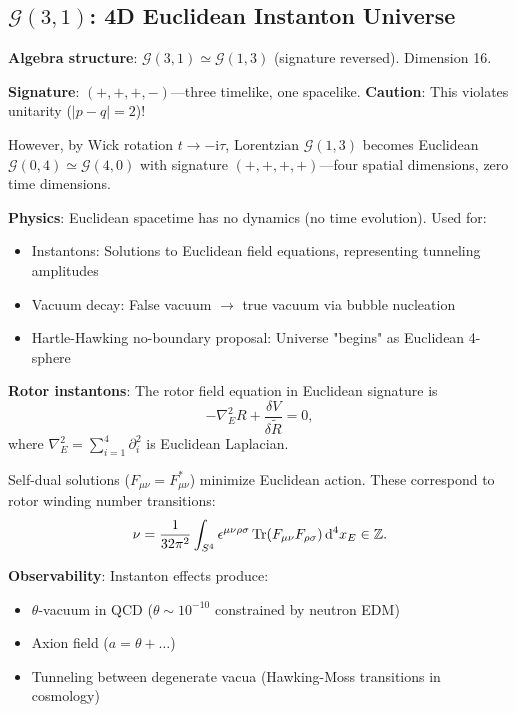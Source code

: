 \documentclass[11pt,a4paper]{article}
\numberwithin{equation}{section}
\theoremstyle{plain}
\theoremstyle{definition}
\theoremstyle{remark}
\newcommand{\Cl}{\mathcal{G}}               %
\newcommand{\rev}[1]{\widetilde{#1}}       %
\newcommand{\dual}[1]{#1^\ast}             %
\renewcommand{\dd}{\mathrm{d}}
\newcommand{\ii}{\mathrm{i}}
\begin{document}
\subsection{$\Cl(3,1)$: 4D Euclidean Instanton Universe}

\textbf{Algebra structure}: $\Cl(3,1) \simeq \Cl(1,3)$ (signature reversed). Dimension 16.

\textbf{Signature}: $(+,+,+,-)$—three timelike, one spacelike. \textbf{Caution}: This violates unitarity ($|p-q| = 2$)!

However, by Wick rotation $t \to -\ii \tau$, Lorentzian $\Cl(1,3)$ becomes Euclidean $\Cl(0,4) \simeq \Cl(4,0)$ with signature $(+,+,+,+)$—four spatial dimensions, zero time dimensions.

\textbf{Physics}: Euclidean spacetime has no dynamics (no time evolution). Used for:
\begin{itemize}
\item Instantons: Solutions to Euclidean field equations, representing tunneling amplitudes
\item Vacuum decay: False vacuum $\to$ true vacuum via bubble nucleation
\item Hartle-Hawking no-boundary proposal: Universe "begins" as Euclidean 4-sphere
\end{itemize}

\textbf{Rotor instantons}: The rotor field equation in Euclidean signature is
\begin{equation}
-\nabla_E^2 R + \frac{\delta V}{\delta \rev{R}} = 0,
\label{eq:euclidean-rotor}
\end{equation}
where $\nabla_E^2 = \sum_{i=1}^4 \partial_i^2$ is Euclidean Laplacian.

Self-dual solutions ($F_{\mu\nu} = \dual{F}_{\mu\nu}$) minimize Euclidean action. These correspond to rotor winding number transitions:
\begin{equation}
\nu = \frac{1}{32\pi^2} \int_{S^4} \epsilon^{\mu\nu\rho\sigma} \Tr(F_{\mu\nu} F_{\rho\sigma}) \, \dd^4x_E \in \mathbb{Z}.
\end{equation}

\textbf{Observability}: Instanton effects produce:
\begin{itemize}
\item $\theta$-vacuum in QCD ($\theta \sim 10^{-10}$ constrained by neutron EDM)
\item Axion field ($a = \theta + \ldots$)
\item Tunneling between degenerate vacua (Hawking-Moss transitions in cosmology)
\end{itemize}
\end{document}
